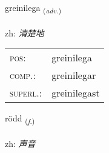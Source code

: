 \documentclass[frontgrid, backgrid]{flacards}\usepackage[]{graphicx}\usepackage[]{color}
\begin{document}
\renewcommand{\flhead}{\vskip5pt \fboxsep=0pt {\small\bfseries\footnotesize Atviksorð | 副词}}
\renewcommand{\fcfoot}{\vskip5pt \fboxsep=0pt \hspace{2pt}{\small\bfseries\footnotesize 2K}}

\renewcommand{\blhead}{\vskip5pt {\small\bfseries\footnotesize Atviksorð | 副词 }}
\renewcommand{\bcfoot}{\vskip5pt \hspace{2pt}{\small\bfseries\footnotesize 2K}}


{greinilega \small{\textsubscript{(\textit{adv.})}} \\[1ex] %
\textphonetic{[kreiːnɪlɛɣa]} \\
zh: \emph{清楚地} \\  [2ex]
\renewcommand*{\arraystretch}{0.8}
\begin{tabular}{ll}
\textsc{pos}: & greinilega \\ 
\textsc{comp.}: & greinilegar \\ 
\textsc{superl.}: & greinilegast \\
\end{tabular}
}

\renewcommand{\flhead}{\vskip5pt \fboxsep=0pt {\small\bfseries\footnotesize Nafnorð | 名词}}
\renewcommand{\fcfoot}{\vskip5pt \fboxsep=0pt \hspace{2pt}{\small\bfseries\footnotesize 2K}}

\renewcommand{\blhead}{\vskip5pt {\small\bfseries\footnotesize Nafnorð | 名词 }}
\renewcommand{\bcfoot}{\vskip5pt \hspace{2pt}{\small\bfseries\footnotesize 2K}}


{rödd \small{\textsubscript{(\textit{f.})}} \\[1ex] %
\textphonetic{[rœt]} \\
zh: \emph{声音} \\  [2ex]
\renewcommand*{\arraystretch}{0.8}
}
\end{document}
